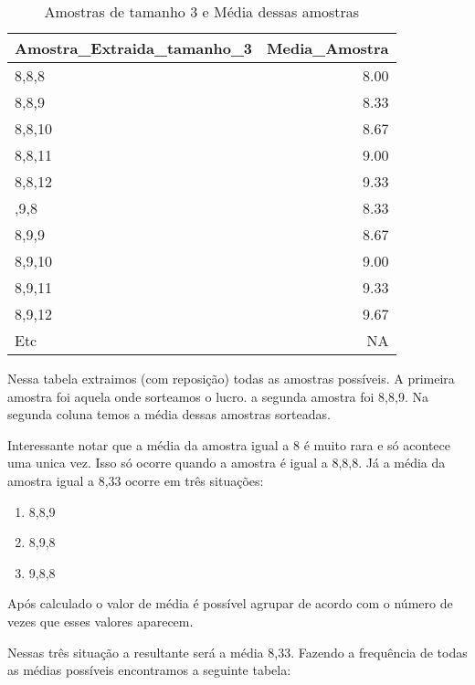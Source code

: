 \documentclass[]{book}
\providecommand{\tightlist}{%
  \setlength{\itemsep}{0pt}\setlength{\parskip}{0pt}}
\theoremstyle{definition}
\theoremstyle{definition}
\theoremstyle{definition}
\theoremstyle{remark}
\begin{document}
\begin{table}

\caption{\label{tab:DA2}Amostras de tamanho 3 e Média dessas amostras}
\centering
\begin{tabular}[t]{lr}
\toprule
Amostra\_Extraida\_tamanho\_3 & Media\_Amostra\\
\midrule
8,8,8 & 8.00\\
8,8,9 & 8.33\\
8,8,10 & 8.67\\
8,8,11 & 9.00\\
8,8,12 & 9.33\\
\addlinespace
8,9,8 & 8.33\\
8,9,9 & 8.67\\
8,9,10 & 9.00\\
8,9,11 & 9.33\\
8,9,12 & 9.67\\
Etc & NA\\
\bottomrule
\end{tabular}
\end{table}

Nessa tabela extraimos (com reposição) todas as amostras possíveis. A
primeira amostra foi aquela onde sorteamos o lucro. a segunda amostra
foi 8,8,9. Na segunda coluna temos a média dessas amostras sorteadas.

Interessante notar que a média da amostra igual a 8 é muito rara e só
acontece uma unica vez. Isso só ocorre quando a amostra é igual a 8,8,8.
Já a média da amostra igual a 8,33 ocorre em três situações:

\begin{enumerate}
\def\labelenumi{\arabic{enumi}.}
\tightlist
\item
  8,8,9
\item
  8,9,8
\item
  9,8,8
\end{enumerate}

Após calculado o valor de média é possível agrupar de acordo com o
número de vezes que esses valores aparecem.

Nessas três situação a resultante será a média 8,33. Fazendo a
frequência de todas as médias possíveis encontramos a seguinte tabela:
\end{document}
